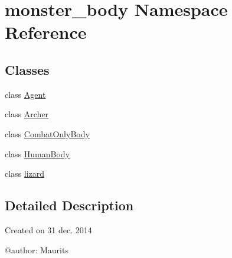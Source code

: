 \hypertarget{namespacemonster__body}{}\section{monster\+\_\+body Namespace Reference}
\label{namespacemonster__body}
\subsection*{Classes}
\begin{DoxyCompactItemize}
\item 
class \hyperlink{classmonster__body_1_1_agent}{Agent}
\item 
class \hyperlink{classmonster__body_1_1_archer}{Archer}
\item 
class \hyperlink{classmonster__body_1_1_combat_only_body}{Combat\+Only\+Body}
\item 
class \hyperlink{classmonster__body_1_1_human_body}{Human\+Body}
\item 
class \hyperlink{classmonster__body_1_1lizard}{lizard}
\end{DoxyCompactItemize}


\subsection{Detailed Description}
\begin{DoxyVerb}Created on 31 dec. 2014

@author: Maurits
\end{DoxyVerb}
 